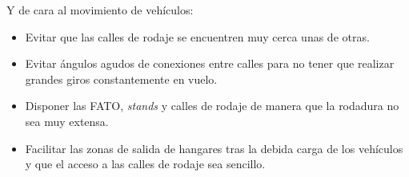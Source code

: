 \documentclass[12pt,a4paper]{book}
\begin{document}
\begin{itemize}
{\begin{itemize}
 \end{itemize}   
Y de cara al movimiento de vehículos:
\begin{itemize}
    \item Evitar que las calles de rodaje se encuentren muy cerca unas de otras.
    \item Evitar ángulos agudos de conexiones entre calles para no tener que realizar grandes giros constantemente en vuelo.
    \item Disponer las FATO, \textsl{stands} y calles de rodaje de manera que la rodadura no sea muy extensa.
    \item Facilitar las zonas de salida de hangares tras la debida carga de los vehículos y que el acceso a las calles de rodaje sea sencillo.
	\end{itemize}}
    

\end{itemize}
\end{document}
